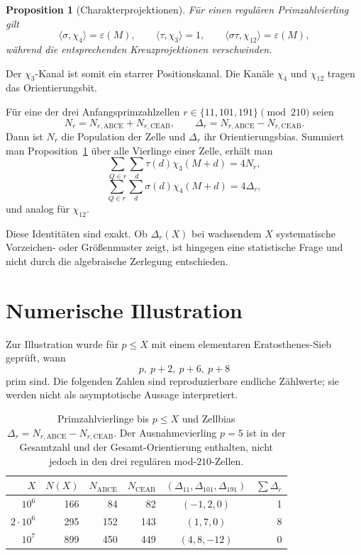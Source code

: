 \documentclass[11pt,a4paper]{article}
\newtheorem{proposition}[satz]{Proposition}
\theoremstyle{definition}
\theoremstyle{remark}
\newcommand{\eps}{\varepsilon}
\newcommand{\ABCE}{\mathrm{ABCE}}
\newcommand{\CEAB}{\mathrm{CEAB}}
\begin{document}
\begin{proposition}[Charakterprojektionen]\label{prop:proj}
Für einen regulären Primzahlvierling gilt
\[
\boxed{\langle\sigma,\chi_4\rangle=\eps(M),}
\qquad
\boxed{\langle\tau,\chi_3\rangle=1,}
\qquad
\boxed{\langle\sigma\tau,\chi_{12}\rangle=\eps(M),}
\]
während die entsprechenden Kreuzprojektionen verschwinden.
\end{proposition}

Der $\chi_3$-Kanal ist somit ein starrer Positionskanal. Die Kanäle $\chi_4$ und $\chi_{12}$ tragen das Orientierungsbit.

Für eine der drei Anfangsprimzahlzellen $r\in\{11,101,191\}\pmod{210}$ seien
\[
N_r=N_{r,\ABCE}+N_{r,\CEAB},\qquad
\Delta_r=N_{r,\ABCE}-N_{r,\CEAB}.
\]
Dann ist $N_r$ die Population der Zelle und $\Delta_r$ ihr Orientierungsbias. Summiert man Proposition~\ref{prop:proj} über alle Vierlinge einer Zelle, erhält man
\[
\sum_{Q\in r}\sum_d\tau(d)\chi_3(M+d)=4N_r,
\]
\[
\sum_{Q\in r}\sum_d\sigma(d)\chi_4(M+d)=4\Delta_r,
\]
und analog für $\chi_{12}$.

Diese Identitäten sind exakt. Ob $\Delta_r(X)$ bei wachsendem $X$ systematische Vorzeichen- oder Größenmuster zeigt, ist hingegen eine statistische Frage und nicht durch die algebraische Zerlegung entschieden.

\section{Numerische Illustration}

Zur Illustration wurde für $p\le X$ mit einem elementaren Eratosthenes-Sieb geprüft, wann
\[
p,\ p+2,\ p+6,\ p+8
\]
prim sind. Die folgenden Zahlen sind reproduzierbare endliche Zählwerte; sie werden nicht als asymptotische Aussage interpretiert.

\begin{table}[h]
\centering
\caption{Primzahlvierlinge bis $p\le X$ und Zellbias $\Delta_r=N_{r,\ABCE}-N_{r,\CEAB}$. Der Ausnahmevierling $p=5$ ist in der Gesamtzahl und der Gesamt-Orientierung enthalten, nicht jedoch in den drei regulären mod-$210$-Zellen.}
\label{tab:counts}
\begin{tabular}{r r r r c r}
\toprule
$X$ & $N(X)$ & $N_{\ABCE}$ & $N_{\CEAB}$ & $(\Delta_{11},\Delta_{101},\Delta_{191})$ & $\sum\Delta_r$\\
\midrule
$10^6$ & 166 & 84 & 82 & $(-1,2,0)$ & 1\\
$2\cdot10^6$ & 295 & 152 & 143 & $(1,7,0)$ & 8\\
$10^7$ & 899 & 450 & 449 & $(4,8,-12)$ & 0\\
\bottomrule
\end{tabular}
\end{table}
\end{document}
